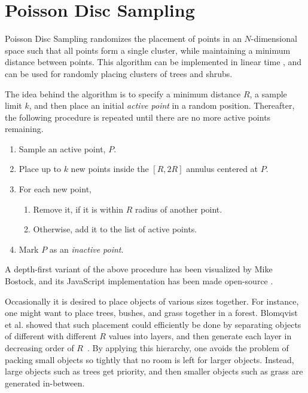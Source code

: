 \section{Poisson Disc Sampling}

Poisson Disc Sampling randomizes the placement of points in an $N$-dimensional space such that all points form a single cluster, while maintaining a minimum distance between points.
This algorithm can be implemented in linear time \cite{poisson_fast}, and can be used for randomly placing clusters of trees and shrubs.


The idea behind the algorithm is to specify a minimum distance $R$, a sample limit $k$, and then place an initial \textit{active point} in a random position.
Thereafter, the following procedure is repeated until there are no more active points remaining.
\vspace{-0.5cm} %
\begin{enumerate}
  \item Sample an active point, $P$.
  \item Place up to $k$ new points inside the $[R, 2R]$ annulus centered at $P$.
  \item For each new point,
  \begin{enumerate}
    \item Remove it, if it is within $R$ radius of another point.
    \item Otherwise, add it to the list of active points.
  \end{enumerate}
  \item Mark $P$ as an \textit{inactive point}.
\end{enumerate}

A depth-first variant of the above procedure has been visualized by Mike Bostock, and its JavaScript implementation has been made open-source \cite{poisson_demo}.

Occasionally it is desired to place objects of various sizes together.
For instance, one might want to place trees, bushes, and grass together in a forest.
Blomqvist et al. showed that such placement could efficiently be done by separating objects of different with different $R$ values into layers, and then generate each layer in decreasing order of $R$~\cite[p.32]{ba_landscape}.
By applying this hierarchy, one avoids the problem of packing small objects so tightly that no room is left for larger objects.
Instead, large objects such as trees get priority, and then smaller objects such as grass are generated in-between.